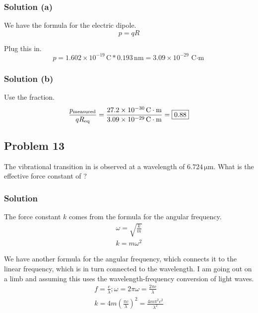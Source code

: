 \documentclass[12pt]{article}
\newcommand{\E}[1]{\times 10^{#1}}
\begin{document}
        \subsubsection{Solution (a)}
            We have the formula for the electric dipole.
            \begin{equation}
                p   =   qR
            \end{equation}

            Plug this in.
            \begin{equation}
                p   =   1.602\E{-19}\,\unit{\coulomb} * 0.193\,\unit{\nano\meter}
                    =   \boxed{3.09\E{-29}\,\unit{\coulomb\cdot\meter}}
            \end{equation}

        \subsubsection{Solution (b)}
            Use the fraction.
            \begin{equation}
                \frac{p_{\rm measured}}{qR_{\rm eq}}    =   \frac{27.2\E{-30}\,\unit{\coulomb\cdot\meter}}{3.09\E{-29}\,\unit{\coulomb\cdot\meter}}
                    =   \boxed{0.88}
            \end{equation}
        
    \pagebreak
    \subsection{Problem 13}
        The vibrational transition in  is observed at a wavelength of $6.724\,\unit{\micro\meter}$. 
        What is the effective force constant of ?

        \subsubsection{Solution}
            The force constant $k$ comes from the formula for the angular frequency.
            \begin{gather}
                \omega  =   \sqrt{\frac{k}{m}}\\
                k   =   m\omega^2
            \end{gather}

            We have another formula for the angular frequency, which connects it to the linear frequency, which is in turn connected to the wavelength.
            I am going out on a limb and assuming this uses the wavelength-frequency conversion of light waves.
            \begin{gather}
                f = \frac{c}{\lambda}; \omega = 2\pi\omega = \frac{2\pi c}{\lambda}\\
                k = 4m\left( \frac{\pi c}{\lambda} \right)^2 = \frac{4m\pi^2 c^2}{\lambda^2}
            \end{gather}
\end{document}
